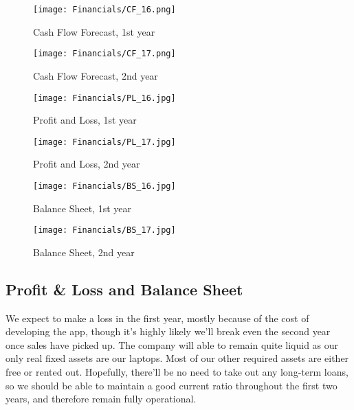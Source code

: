\documentclass[12pt]{article}
\begin{document}
\begin{landscape}

    \begin{figure}
        \centering
        \texttt{[image: Financials/CF\_16.png]}
        \caption{Cash Flow Forecast, 1st year}
        \label{fig:CF16}
    \end{figure}

    \begin{figure}
        \centering
        \texttt{[image: Financials/CF\_17.png]}
        \caption{Cash Flow Forecast, 2nd year}
        \label{fig:CF17}
    \end{figure}
    
\end{landscape}

\begin{figure}[!hp]
    \centering
    \texttt{[image: Financials/PL\_16.jpg]}
    \caption{Profit and Loss, 1st year}
    \label{fig:PL16}
\end{figure}

\begin{figure}[!hp]
    \centering
    \texttt{[image: Financials/PL\_17.jpg]}
    \caption{Profit and Loss, 2nd year}
    \label{fig:PL17}
\end{figure}

\begin{figure}[!hp]
    \centering
    \texttt{[image: Financials/BS\_16.jpg]}
    \caption{Balance Sheet, 1st year}
    \label{fig:BS16}
\end{figure}

\begin{figure}[!hp]
    \centering
    \texttt{[image: Financials/BS\_17.jpg]}
    \caption{Balance Sheet, 2nd year}
    \label{fig:BS17}
\end{figure}

\subsection{Profit \& Loss and Balance Sheet}
We expect to make a loss in the first year, mostly because of the cost of developing the app, though it’s highly likely we’ll break even the second year once sales have picked up.
The company will able to remain quite liquid as our only real fixed assets are our laptops. Most of our other required assets are either free or rented out. Hopefully, there’ll be no need to take out any long-term loans, so we should be able to maintain a good current ratio throughout the first two years, and therefore remain fully operational.
\end{document}
